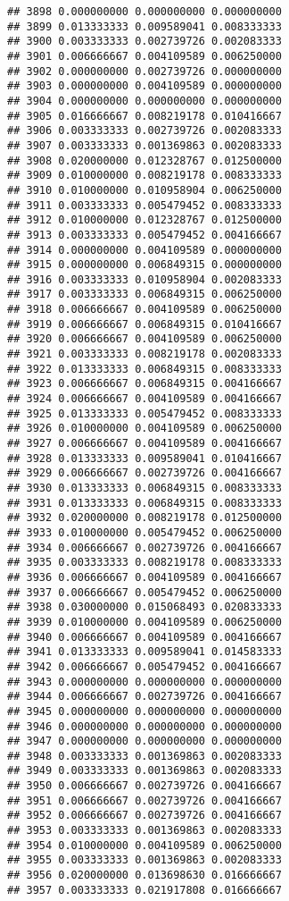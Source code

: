 \documentclass[
]{article}
\begin{document}
\begin{verbatim}
## 3898 0.000000000 0.000000000 0.000000000
## 3899 0.013333333 0.009589041 0.008333333
## 3900 0.003333333 0.002739726 0.002083333
## 3901 0.006666667 0.004109589 0.006250000
## 3902 0.000000000 0.002739726 0.000000000
## 3903 0.000000000 0.004109589 0.000000000
## 3904 0.000000000 0.000000000 0.000000000
## 3905 0.016666667 0.008219178 0.010416667
## 3906 0.003333333 0.002739726 0.002083333
## 3907 0.003333333 0.001369863 0.002083333
## 3908 0.020000000 0.012328767 0.012500000
## 3909 0.010000000 0.008219178 0.008333333
## 3910 0.010000000 0.010958904 0.006250000
## 3911 0.003333333 0.005479452 0.008333333
## 3912 0.010000000 0.012328767 0.012500000
## 3913 0.003333333 0.005479452 0.004166667
## 3914 0.000000000 0.004109589 0.000000000
## 3915 0.000000000 0.006849315 0.000000000
## 3916 0.003333333 0.010958904 0.002083333
## 3917 0.003333333 0.006849315 0.006250000
## 3918 0.006666667 0.004109589 0.006250000
## 3919 0.006666667 0.006849315 0.010416667
## 3920 0.006666667 0.004109589 0.006250000
## 3921 0.003333333 0.008219178 0.002083333
## 3922 0.013333333 0.006849315 0.008333333
## 3923 0.006666667 0.006849315 0.004166667
## 3924 0.006666667 0.004109589 0.004166667
## 3925 0.013333333 0.005479452 0.008333333
## 3926 0.010000000 0.004109589 0.006250000
## 3927 0.006666667 0.004109589 0.004166667
## 3928 0.013333333 0.009589041 0.010416667
## 3929 0.006666667 0.002739726 0.004166667
## 3930 0.013333333 0.006849315 0.008333333
## 3931 0.013333333 0.006849315 0.008333333
## 3932 0.020000000 0.008219178 0.012500000
## 3933 0.010000000 0.005479452 0.006250000
## 3934 0.006666667 0.002739726 0.004166667
## 3935 0.003333333 0.008219178 0.008333333
## 3936 0.006666667 0.004109589 0.004166667
## 3937 0.006666667 0.005479452 0.006250000
## 3938 0.030000000 0.015068493 0.020833333
## 3939 0.010000000 0.004109589 0.006250000
## 3940 0.006666667 0.004109589 0.004166667
## 3941 0.013333333 0.009589041 0.014583333
## 3942 0.006666667 0.005479452 0.004166667
## 3943 0.000000000 0.000000000 0.000000000
## 3944 0.006666667 0.002739726 0.004166667
## 3945 0.000000000 0.000000000 0.000000000
## 3946 0.000000000 0.000000000 0.000000000
## 3947 0.000000000 0.000000000 0.000000000
## 3948 0.003333333 0.001369863 0.002083333
## 3949 0.003333333 0.001369863 0.002083333
## 3950 0.006666667 0.002739726 0.004166667
## 3951 0.006666667 0.002739726 0.004166667
## 3952 0.006666667 0.002739726 0.004166667
## 3953 0.003333333 0.001369863 0.002083333
## 3954 0.010000000 0.004109589 0.006250000
## 3955 0.003333333 0.001369863 0.002083333
## 3956 0.020000000 0.013698630 0.016666667
## 3957 0.003333333 0.021917808 0.016666667

\end{verbatim}
\end{document}
